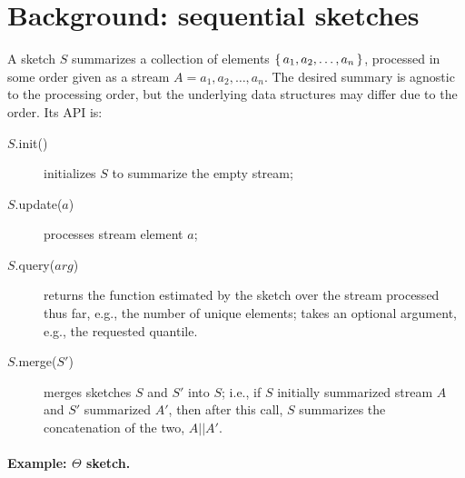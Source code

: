 \section{Background: sequential sketches}
\label{fc-sec:background}

A sketch $S$ summarizes a collection of elements $\{\,a_1,a_2,\dots,a_n\,\}$, processed
in some order given as a stream $A=a_1,a_2,\dots,a_n$.
The desired summary is agnostic to the processing order,
but the underlying data structures may differ due to the order. Its API is:

\begin{description}
\item[$S$.init()] initializes $S$ to summarize the empty stream;
\item[$S$.update($a$)] processes stream element $a$;
\item[$S$.query($arg$)] returns the function estimated by the sketch over the stream processed thus far, e.g., the number of unique elements; 
 takes an optional argument, e.g., the requested quantile.
 \item[$S$.merge($S'$)] merges sketches $S$ and $S'$ into $S$; i.e., if $S$ initially summarized stream $A$ and $S'$ 
 summarized $A'$, then after this call, $S$ summarizes the concatenation of the two, $A||A'$.
\end{description}

\paragraph{Example: $\Theta$ sketch.}

